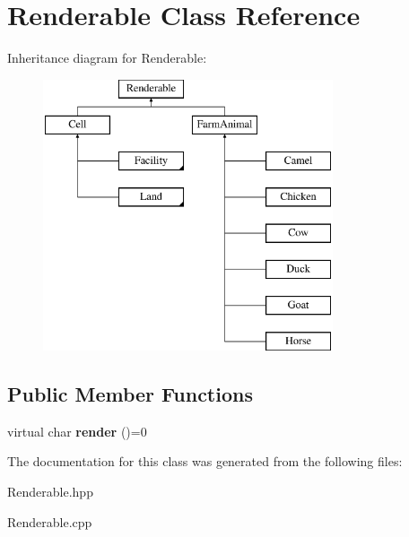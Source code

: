 \hypertarget{class_renderable}{}\section{Renderable Class Reference}
\label{class_renderable}
Inheritance diagram for Renderable\+:\begin{figure}[H]
\begin{center}
\leavevmode
\includegraphics[height=8.000000cm]{class_renderable}
\end{center}
\end{figure}
\subsection*{Public Member Functions}
\begin{DoxyCompactItemize}
\item 
\mbox{\label{class_renderable_aafa9280e6dcfa557b3cd675221fd97b4}} 
virtual char {\bfseries render} ()=0
\end{DoxyCompactItemize}


The documentation for this class was generated from the following files\+:\begin{DoxyCompactItemize}
\item 
Renderable.\+hpp\item 
Renderable.\+cpp\end{DoxyCompactItemize}
